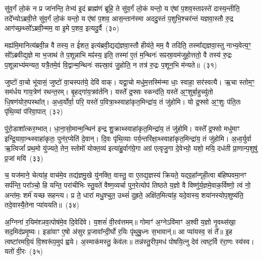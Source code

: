 सु॑व॒र्गं लो॒कं न प्र जा॑नन्ति॒ तेभ्य॑ इ॒दं ब्राह्म॑णं ब्रूहि॒ ते सु॑व॒र्गं लो॒कं यन्तो॒ य ए॑षां प॒शव॒स्ताꣴस्ते॑ दास्य॒न्तीति॒ तदे᳚भ्यो\-ऽब्रवी॒त्ते सु॑व॒र्गं लो॒कं यन्तो॒ य ए॑षां प॒शव॒ आस॒न्तान॑स्मा अददु॒स्तं प॒शुभि॒श्चर॑न्तं यज्ञवा॒स्तौ रु॒द्र आग॑च्छ॒थ्सो᳚\-ऽब्रवी॒न्मम॒ वा इ॒मे प॒शव॒ इत्यदु॒र्वै~(३०)\ip

मह्य॑मि॒मानित्य॑ब्रवी॒न्न वै तस्य॒ त ई॑शत॒ इत्य॑ब्रवी॒द्यद्य॑ज्ञवा॒स्तौ हीय॑ते॒ मम॒ वै तदिति॒ तस्मा᳚द्\-यज्ञवा॒स्तु नाभ्य॒वेत्य॒ꣳ॒ सो᳚\-ऽब्रवीद्य॒ज्ञे मा भ॒जाथ॑ ते प॒शून्नाभि मꣴ॑स्य॒ इति॒ तस्मा॑ ए॒तं म॒न्थिनः॑ सꣴस्रा॒वम॑जुहो॒त्ततो॒ वै तस्य॑ रु॒द्रः प॒शून्नाभ्य॑मन्यत॒ यत्रै॒तमे॒वं वि॒द्वान्म॒न्थिनः॑ सꣴस्रा॒वं जु॒होति॒ न तत्र॑ रु॒द्रः प॒शून॒भि म॑न्यते॥~(३१)\ip

{}

जुष्टो॑ वा॒चो भू॑यासं॒ जुष्टो॑ वा॒चस्पत॑ये॒ देवि॑ वाक्। यद्वा॒चो मधु॑म॒त्तस्मि॑न्मा धाः॒ स्वाहा॒ सर॑स्वत्यै। ऋ॒चा स्तोम॒ꣳ॒ सम॑र्धय गाय॒त्रेण॑ रथन्त॒रम्। बृ॒हद्गा॑य॒त्रव॑र्तनि। यस्ते᳚ द्र॒फ्सः स्कन्द॑ति॒ यस्ते॑ अ॒ꣳ॒शुर्बा॒हुच्यु॑तो धि॒षण॑योरु॒पस्था᳚त्। अ॒ध्व॒र्योर्वा॒ परि॒ यस्ते॑ प॒वित्रा॒थ्\-स्वाहा॑कृत॒मिन्द्रा॑य॒ तं जु॑होमि। यो द्र॒फ्सो अ॒ꣳ॒शुः प॑ति॒तः पृ॑थि॒व्यां प॑रिवा॒पात्~(३२)\ip

पु॑रो॒डाशा᳚त्कर॒म्भात्। धा॒ना॒सो॒मान्म॒न्थिन॑ इन्द्र शु॒क्राथ्\-स्वाहा॑कृत॒मिन्द्रा॑य॒ तं जु॑होमि। यस्ते᳚ द्र॒फ्सो मधु॑माꣳ इन्द्रि॒यावा॒न्थ्\-स्वाहा॑कृतः॒ पुन॑र॒प्येति॑ दे॒वान्। दि॒वः पृ॑थि॒व्याः पर्य॒न्तरि॑क्षा॒थ्\-स्वाहा॑कृत॒मिन्द्रा॑य॒ तं जु॑होमि। अ॒ध्व॒र्युर्वा ऋ॒त्विजां᳚ प्रथ॒मो यु॑ज्यते॒ तेन॒ स्तोमो॑ योक्त॒व्य॑ इत्या॑हु॒र्वाग॑ग्रे॒गा अग्र॑ एत्वृजु॒गा दे॒वेभ्यो॒ यशो॒ मयि॒ दध॑ती प्रा॒णान्प॒शुषु॑ प्र॒जां मयि॑~(३३)\ip

च॒ यज॑माने॒ चेत्या॑ह॒ वाच॑मे॒व तद्य॑ज्ञमु॒खे यु॑नक्ति॒ वास्तु॒ वा ए॒तद्य॒ज्ञस्य॑ क्रियते॒ यद्ग्र॒हा᳚न्गृही॒त्वा ब॑हिष्पवमा॒नꣳ सर्प॑न्ति॒ परा᳚ञ्चो॒ हि यन्ति॒ परा॑चीभिः स्तु॒वते॑ वैष्ण॒व्यर्चा पुन॒रेत्योप॑ तिष्ठते य॒ज्ञो वै विष्णु॑र्य॒ज्ञमे॒वाक॒र्विष्णो॒ त्वं नो॒ अन्त॑मः॒ शर्म॑ यच्छ सहन्त्य। प्र ते॒ धारा॑ मधु॒श्चुत॒ उथ्सं॑ दुह्रते॒ अक्षि॑त॒मित्या॑ह॒ यदे॒वास्य॒ शया॑नस्योप॒शुष्य॑ति॒ तदे॒वास्यै॒तेना प्या॑ययति॥~(३४)\ip

{\anuvakamend[{प॒रि॒वा॒पात्प्र॒जां मयि॑ दुह्रते॒ चतु॑र्दश च}]}%

अ॒ग्निना॑ र॒यिम॑श्ञव॒त्पोष॑मे॒व दि॒वेदि॑वे। य॒शसं॑ वी॒रव॑त्तमम्॥ गोमाꣳ॑ अ॒ग्ने\-ऽवि॑माꣳ अ॒श्वी य॒ज्ञो नृ॒वथ्स॑खा॒ सद॒मिद॑प्रमृ॒ष्यः। इडा॑वाꣳ ए॒षो अ॑सुर प्र॒जावा᳚न्दी॒र्घो र॒यिः पृ॑थुबु॒ध्नः स॒भावान्॑॥ आ प्या॑यस्व॒ सं ते᳚॥ इ॒ह त्वष्टा॑रमग्रि॒यं वि॒श्वरू॑प॒मुप॑ ह्वये। अ॒स्माक॑मस्तु॒ केव॑लः॥ तन्न॑स्तु॒रीप॒मध॑ पोषयि॒त्नु देव॑ त्वष्ट॒र्वि र॑रा॒णः स्य॑स्व। यतो॑ वी॒रः~(३५)\ip

